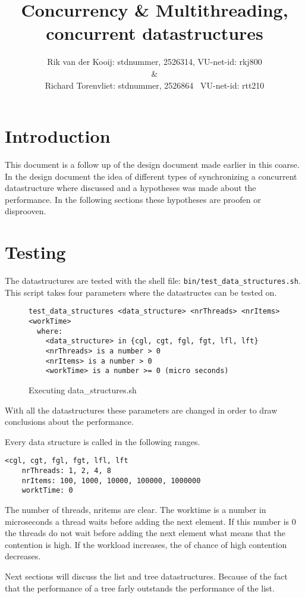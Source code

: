 \documentclass[10pt,a4paper]{article}
\author{Rik van der Kooij: stdnummer, 2526314, VU-net-id: rkj800\\ \&  \\ Richard Torenvliet: stdnummer, 2526864 \ VU-net-id: rtt210}
\title{Concurrency \& Multithreading, concurrent datastructures}
\begin{document}
\maketitle
\tableofcontents

\section{Introduction}
This document is a follow up of the design document made earlier in this coarse. In the design document the idea of different types of synchronizing a concurrent datastructure where discussed and a hypotheses was made about the performance. In the following sections these hypotheses are proofen or disprooven.

\section{Testing}
The datastructures are tested with the shell file: \texttt{bin/test\_data\_structures.sh}. This script takes four parameters where the datastructes can be tested on.

\begin{figure}[h!]
\center
\begin{lstlisting}
test_data_structures <data_structure> <nrThreads> <nrItems> <workTime>
  where:
    <data_structure> in {cgl, cgt, fgl, fgt, lfl, lft}
    <nrThreads> is a number > 0
    <nrItems> is a number > 0
    <workTime> is a number >= 0 (micro seconds)
\end{lstlisting}
\caption{Executing data\_structures.sh}
\end{figure}

With all the datastructures these parameters are changed in order to draw conclusions about the performance. 

Every data structure is called in the following ranges.
\begin{lstlisting}
<cgl, cgt, fgl, fgt, lfl, lft
	nrThreads: 1, 2, 4, 8
	nrItems: 100, 1000, 10000, 100000, 1000000
	worktTime: 0
\end{lstlisting}

The number of threads, nritems are clear. The worktime is a number in microseconds a thread waits before adding the next element. If this number is 0 the threads do not wait before adding the next element what means that the contention is high. If the workload increases, the of chance of high contention decreases.

Next sections will discuss the list and tree datastructures. Because of the fact that the performance of a tree farly outstands the performance of the list.
\end{document}
